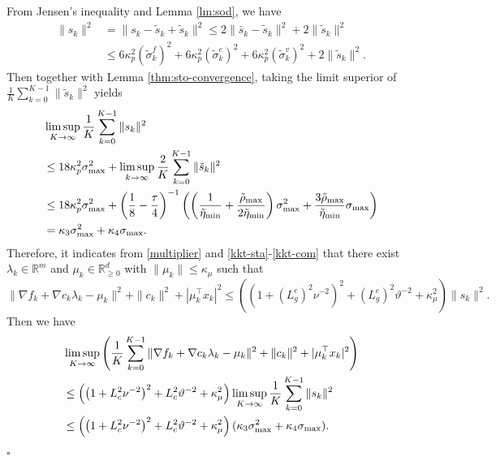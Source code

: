 \documentclass[11pt]{article}
\newenvironment{proof}{{\noindent\it Proof.}\quad}{\hfill $\square$\par}
\newcommand{\R}{\mathbb{R}}
\newcommand{\be}{\begin{equation}}
\newcommand{\ee}{\end{equation}}
\begin{document}
\begin{proof}
    From Jensen's inequality and Lemma \ref{lm:sod}, we have
    \be\begin{aligned}\label{eq:bars}
        \|s_k\|^2 &= \|s_k - \tilde s_k + \tilde s_k\|^2 \leq 2 \|\bar s_k - \tilde s_k\|^2 + 2\|\tilde s_k\|^2\\
        &\leq 6\kappa_p^2(\tilde \sigma_k^f)^2 + 6\kappa_p^2(\tilde \sigma_k^c)^2 + 6\kappa_p^2(\tilde \sigma_k^v)^2 + 2\|\tilde s_k\|^2.
    \end{aligned}\ee
    Then together with Lemma \ref{thm:sto-convergence}, taking the limit superior of $\frac{1}{K}\sum_{k=0}^{K-1}\|\tilde{s}_k\|^2$ yields
    \begin{align*}
        & \limsup_{K \to \infty}\frac{1}{K}\sum_{k=0}^{K-1}\|s_k\|^2\\ &\leq 18\kappa_p^2\sigma_{\rm max}^2 + \limsup_{k \to \infty}\frac{2}{K}\sum_{k=0}^{K-1}\|\tilde s_k\|^2\\
        &\leq 18\kappa_p^2\sigma_{\rm max}^2 + \left(\frac{1}{8}-\frac{\tau}{4}\right)^{-1} \left(\left(\frac{1}{\tilde \eta_{\min}}+\frac{\tilde \rho_{\rm max}}{2\tilde \eta_{\rm min}}\right)\sigma_{\rm max}^2 + \frac{3\tilde \rho_{\rm max}}{\tilde \eta_{\rm min}}\sigma_{\rm max}\right)\\
        &= \kappa_3 \sigma_{\rm max}^2 + \kappa_4 \sigma_{\rm max}.
    \end{align*}
    Therefore, it indicates from \eqref{multiplier} and \eqref{kkt-sta}-\eqref{kkt-com} that there exist \(\lambda_k \in \R^m\) and  \(\mu_k \in \R^d_{\ge 0}\) with \(\|\mu_k\| \leq \kappa_\mu\) such that
    \be\label{cc}
    \|\nabla f_k + \nabla c_k \lambda_k - \mu_k\|^2 + \|c_k\|^2 + |\mu_k^\top x_k|^2 \leq \left(\left(1+(L_g^c)^2\nu^{-2}\right)^2+(L_g^c)^2\vartheta^{-2}+\kappa_\mu^2\right)\|s_k\|^2.
    \ee
    Then we have
    \begin{align*}
        &\limsup_{K \to \infty} \left(\frac{1}{K} \sum_{k=0}^{K-1} \|\nabla f_k + \nabla c_k \lambda_k - \mu_k\|^2 + \|c_k\|^2 + |\mu_k^\top x_k|^2 \right)\\
        &\leq \left(\left(1+L_c^2\nu^{-2}\right)^2+ L_c^2\vartheta^{-2}+\kappa_\mu^2\right)\limsup_{K \to \infty}\frac{1}{K}\sum_{k=0}^{K-1}\|s_k\|^2\\
        &\leq \left(\left(1+L_c^2\nu^{-2}\right)^2+ L_c^2\vartheta^{-2}+\kappa_\mu^2\right) (\kappa_3 \sigma_{\rm max}^2 + \kappa_4 \sigma_{\rm max}).

\end{align*}
\end{proof}
\end{document}

